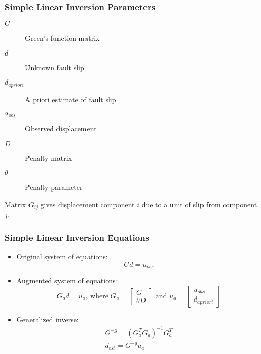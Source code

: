 \documentclass[aspectratio=169]{beamer}
\begin{document}
\begin{frame}
  \frametitle{Simple Linear Inversion Parameters}
  \summary{}

  \begin{description}
  \item[$G$] Green's function matrix
  \item[$d$] Unknown fault slip
  \item[$d_\mathit{apriori}$] A priori estimate of fault slip
  \item[$u_\mathit{obs}$] Observed displacement
  \item[$D$] Penalty matrix
  \item[$\theta$] Penalty parameter
  \end{description}
  
  \vfill
  Matrix $G_{ij}$ gives displacement component $i$ due to a unit of slip from component $j$.

\end{frame}


\begin{frame}
  \frametitle{Simple Linear Inversion Equations}
  \summary{}

  \begin{itemize}
  \item Original system of equations:
    \begin{equation}
      G d = u_\mathit{obs}
    \end{equation}
  \item Augmented system of equations:
    \begin{equation}
      G_a d = u_a \text{, where } 
      G_a = \left[ \begin{array}{c} G \\ \theta D \end{array} \right]
      \text{ and }
      u_a = \left[ \begin{array}{c} u_{obs} \\ d_\mathit{apriori} \end{array} \right]
    \end{equation}
  \item Generalized inverse:
    \begin{gather}
      G^{-g} = \left( G_a^T G_a \right)^{-1} G_a^T \\
      d_{est} = G^{-g} u_a
    \end{gather}
  \end{itemize}
  
\end{frame}
\end{document}
